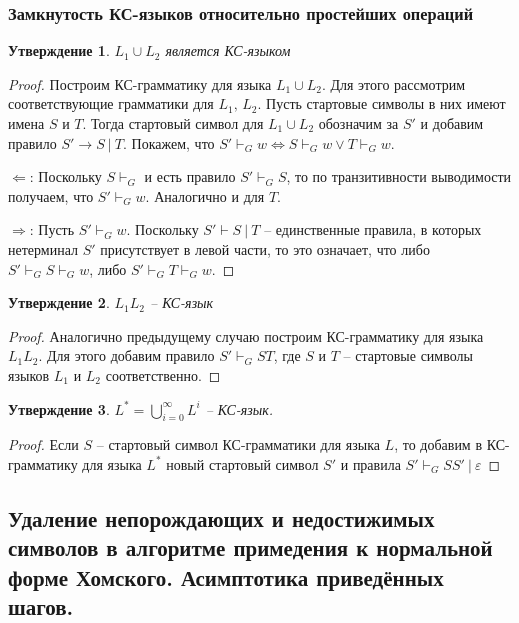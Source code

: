 \documentclass[a4paper,12pt]{article}
\theoremstyle{plain}
\newtheorem{proposition}{Утверждение}[subsection]
\theoremstyle{definition}
\theoremstyle{remark}
\begin{document}
\subsubsection*{Замкнутость КС-языков относительно простейших операций}
\begin{proposition}
	$L_1 \cup L_2$ является КС-языком
\end{proposition}

\begin{proof}
	Построим КС-грамматику для языка $L_1 \cup L_2$. Для этого рассмотрим соответствующие грамматики для $L_1,\, L_2$. Пусть стартовые символы в них имеют имена $S$ и $T$. Тогда стартовый символ для $L_1 \cup L_2$ обозначим за $S'$ и добавим правило $S' \to S \:|\: T$. Покажем, что $S' \vdash_G w \Leftrightarrow S \vdash_G w \lor T \vdash_G w$.

	$\Leftarrow$: Поскольку $S \vdash_G$ и есть правило $S' \vdash_G S$, то по транзитивности выводимости получаем, что $S' \vdash_G w$. Аналогично и для $T$.

	$\Rightarrow$: Пусть $S' \vdash_G w$. Поскольку $S' \vdash S \:|\: T$ -- единственные правила, в которых нетерминал $S'$ присутствует в левой части, то это означает, что либо $S' \vdash_G S \vdash_G w$, либо $S' \vdash_G T \vdash_G w$.
\end{proof}

\begin{proposition}
	$L_1L_2$ -- КС-язык
\end{proposition}

\begin{proof}
	Аналогично предыдущему случаю построим КС-грамматику для языка $L_1L_2$. Для этого добавим правило $S' \vdash_G ST$, где $S$ и $T$ -- стартовые символы языков $L_1$ и $L_2$ соответственно.
\end{proof}

\begin{proposition}
	$L^* = \bigcup_{i = 0}^\infty L^i$ -- КС-язык.
\end{proposition}

\begin{proof}
	Если $S$ -- стартовый символ КС-грамматики для языка $L$, то добавим в КС-грамматику для языка $L^*$ новый стартовый символ $S'$ и правила $S' \vdash_G SS' \:|\: \varepsilon$
\end{proof}

\subsection{Удаление непорождающих и недостижимых символов в алгоритме примедения к нормальной форме Хомского. Асимптотика приведённых шагов.}
\end{document}
